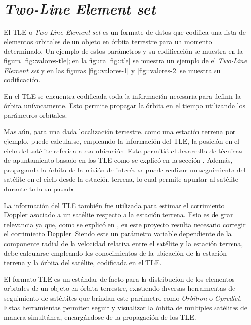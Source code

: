 \documentclass[../../main.tex]{subfiles}
\begin{document}
\graphicspath{{./figures}}
\chapter{\textit{Two-Line Element set}}\label{ap::tle}

El TLE o \textit{Two-Line Element set} es un formato de datos que codifica una lista de elementos orbitales de un objeto en órbita terrestre para un momento determinado\cite{tle-wiki}. Un ejemplo de estos parámetros y su codificación se muestra en la figura \ref{fig::valores-tle}; en la figura \ref{fig::tle} se muestra un ejemplo de el \textit{Two-Line Element set} y en las figuras \ref{fig::valores-1} y \ref{fig::valores-2} se muestra su codificación.

En el TLE se encuentra codificada toda la información necesaria para definir la órbita unívocamente. Esto permite propagar la órbita en el tiempo utilizando los parámetros orbitales.

Mas aún, para una dada localización terrestre, como una estación terrena por ejemplo, puede calcularse, empleando la información del TLE, la posición en el cielo del satélite referida a esa ubicación. Esto permitió el desarrollo de técnicas de apuntamiento basado en los TLE como se explicó en la sección . Además, propagando la órbita de la misión de interés se puede realizar un seguimiento del satélite en el cielo desde la estación terrena, lo cual permite apuntar al satélite durante toda su pasada.

La información del TLE también fue utilizada para estimar el corrimiento Doppler asociado a un satélite respecto a la estación terrena. Esto es de gran relevancia ya que, como se explicó en , en este proyecto resulta necesario corregir el corrimiento Doppler. Siendo este un parámetro variable dependiente de la componente radial de la velocidad relativa entre el satélite y la estación terrena, debe calcularse empleando los conocimientos de la ubicación de la estación terrena y la órbita del satélite, codificada en el TLE.

El formato TLE es un estándar de facto para la distribución de los elementos orbitales de un objeto en órbita terrestre, existiendo diversas herramientas de seguimiento de satéltites que brindan este parámetro como \textit{Orbitron}\cite{orbitron} o \textit{Gpredict}\cite{gpredict}. Estas herramientas permiten seguir y visualizar la órbita de múltiples satélites de manera simultánea, encargándose de la propagación de los TLE.
\end{document}
